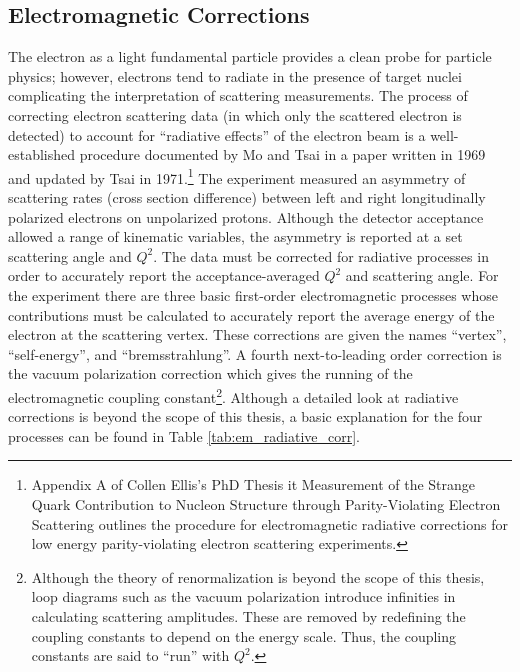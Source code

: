 \subsection{Electromagnetic Corrections}
The electron as a light fundamental particle provides a clean probe for particle physics; however, electrons tend to radiate in the presence of target nuclei complicating the interpretation of scattering measurements. The process of correcting electron scattering data (in which only the scattered electron is detected) to account for ``radiative effects'' of the electron beam is a well-established procedure documented by Mo and Tsai\cite{MoAndTsai} in a paper written in 1969 and updated by Tsai\cite{Tsai1971} in 1971.\footnote{Appendix A of Collen Ellis's PhD Thesis {it Measurement of the Strange Quark Contribution to Nucleon Structure through Parity-Violating Electron Scattering}\cite{ColleenEllis} outlines the procedure for electromagnetic radiative corrections for low energy parity-violating electron scattering experiments.} The \Qs experiment measured an asymmetry of scattering rates (cross section difference) between left and right longitudinally polarized electrons on unpolarized protons. Although the detector acceptance allowed a range of kinematic variables, the asymmetry is reported at a set scattering angle and $Q^2$. The data must be corrected for radiative processes in order to accurately report the acceptance-averaged $Q^2$ and scattering angle. For the \Qs experiment there are three basic first-order electromagnetic processes whose contributions must be calculated to accurately report the average energy of the electron at the scattering vertex. These corrections are given the names ``vertex'', ``self-energy'', and ``bremsstrahlung''. A fourth next-to-leading order correction is the vacuum polarization correction which gives the running of the electromagnetic coupling constant\footnote{Although the theory of renormalization is beyond the scope of this thesis, loop diagrams such as the vacuum polarization introduce infinities in calculating scattering amplitudes. These are removed by redefining the coupling constants to depend on the energy scale. Thus, the coupling constants are said to ``run'' with $Q^2$.}. Although a detailed look at radiative corrections is beyond the scope of this thesis, a basic explanation for the four processes can be found in Table \ref{tab:em_radiative_corr}.
